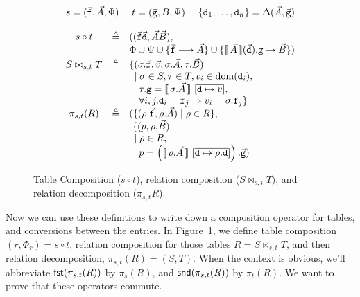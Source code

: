 \begin{figure}[tpb]
  \[\begin{array}{ccl}
      \multicolumn 3 c
      {s = (\vec{\var f},\vec A, \Phi)\hfill t = (\vec{\var g},B, \Psi) \hfill \{\var d_1, \ldots, \var d_n\} = \Delta(\vec A, \vec{\var g})}\\\\
      s \circ t
      & \triangleq
      & ((\vec{\var f}\vec{\var d}, \vec A\vec B),\\
      && \Phi \cup \Psi \cup \{\vec{\var f} \longrightarrow \vec A\} \cup \{ \bracbb{\vec A}(\vec{\var d}).\var g \to \vec B \})\\[.2em]
      S \bowtie_{s,t}T
      & \triangleq
      & \{(\sigma.\vec{\var f},\vec v,\sigma.\vec A,\tau.\vec B) \\
      && \hspace{.5em}
         \mid \sigma \in S, \tau \in T, v_i \in \dom(\var d_i), \\
      && \hspace{1em}
         \tau.\var g = \bracbb{\sigma.\vec A}~[\overline{\var d \mapsto v}],\\
      && \hspace{1em}
         \forall i,j. \var d_i = \var f_j \Rightarrow v_i = \sigma.\var f_j
         \}\\        
      \pi_{s,t}(R)
      & \triangleq
      & (\{(\rho.\vec{\var f},\rho.\vec A) \mid \rho \in R\}, \\
      && ~\{(p, \rho.\vec B) \\
      && \hspace{.5em} \mid \rho \in R, \\
      && \hspace{1em} p = \left(\bracbb{\rho.\vec A}~[\overline{\var d \mapsto \rho.\var d}] \right).\vec{\var g})
    \end{array}
  \]  
  \caption{Table Composition ($s \circ t$), relation composition
    ($S \bowtie_{s,t}T$), and relation decomposition ($\pi_{s,t}R$).}
  \label{fig:compose-tables}
\end{figure}

Now we can use these definitions to write down a composition operator
for tables, and conversions between the entries. In
Figure~\ref{fig:compose-tables}, we define table composition
$(r,\Phi_r) = s \circ t$, relation composition for those tables
$R = S \bowtie_{s,t} T$, and then relation decomposition,
$\pi_{s,t}(R) = (S,T)$. When the context is obvious, we'll abbreviate
$\mathsf{fst}(\pi_{s,t}(R))$ by $\pi_{s}(R)$, and $\mathsf{snd}(\pi_{s,t}(R))$ by
$\pi_t(R)$. We want to prove that these operators commute.

